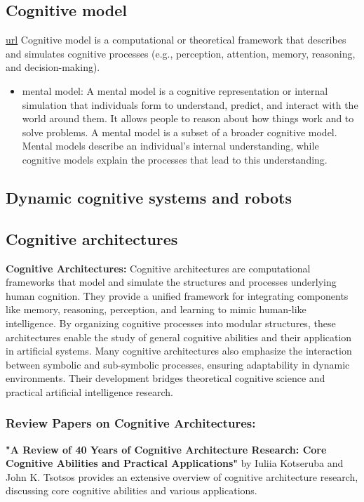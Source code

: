     \subsection{Cognitive model} \href{https://en.wikipedia.org/wiki/Cognitive_model#Dynamical_systems}{url}
        Cognitive model is a computational or theoretical framework that describes and simulates cognitive processes (e.g., perception, attention, memory, reasoning, and decision-making).
        \begin{itemize}
            \item mental model: A mental model is a cognitive representation or internal simulation that individuals form to understand, predict, and interact with the world around them. It allows people to reason about how things work and to solve problems. A mental model is a subset of a broader cognitive model. Mental models describe an individual's internal understanding, while cognitive models explain the processes that lead to this understanding.
        \end{itemize}
    \subsection {Dynamic cognitive systems and robots}

    \subsection{Cognitive architectures}
        \textbf{Cognitive Architectures:} Cognitive architectures are computational frameworks that model and simulate the structures and processes underlying human cognition. They provide a unified framework for integrating components like memory, reasoning, perception, and learning to mimic human-like intelligence. By organizing cognitive processes into modular structures, these architectures enable the study of general cognitive abilities and their application in artificial systems. Many cognitive architectures also emphasize the interaction between symbolic and sub-symbolic processes, ensuring adaptability in dynamic environments. Their development bridges theoretical cognitive science and practical artificial intelligence research. 

        \subsubsection{Review Papers on Cognitive Architectures:}

            \textbf{"A Review of 40 Years of Cognitive Architecture Research: Core Cognitive Abilities and Practical Applications"} by Iuliia Kotseruba and John K. Tsotsos provides an extensive overview of cognitive architecture research, discussing core cognitive abilities and various applications. 

